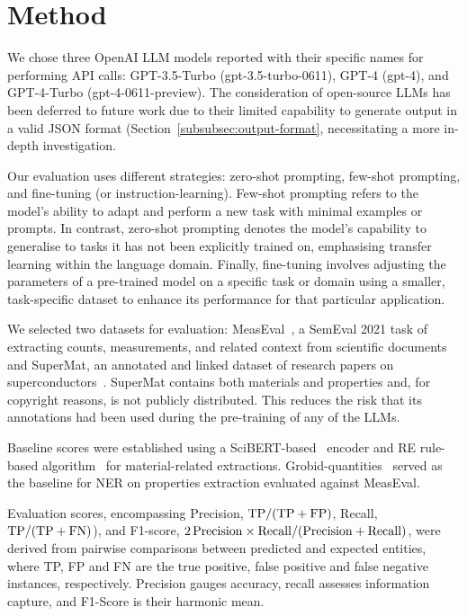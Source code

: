 

\section{Method}
\label{sec:method}

We chose three OpenAI LLM models reported with their specific names for performing API calls: GPT-3.5-Turbo (gpt-3.5-turbo-0611), GPT-4 (gpt-4), and GPT-4-Turbo (gpt-4-0611-preview). 
The consideration of open-source LLMs has been deferred to future work due to their limited capability to generate output in a valid JSON format (Section~\ref{subsubsec:output-format}, necessitating a more in-depth investigation.

Our evaluation uses different strategies: zero-shot prompting, few-shot prompting, and fine-tuning (or instruction-learning).  
Few-shot prompting refers to the model's ability to adapt and perform a new task with minimal examples or prompts. In contrast, zero-shot prompting denotes the model's capability to generalise to tasks it has not been explicitly trained on, emphasising transfer learning within the language domain.
Finally, fine-tuning involves adjusting the parameters of a pre-trained model on a specific task or domain using a smaller, task-specific dataset to enhance its performance for that particular application.

We selected two datasets for evaluation: MeasEval~\cite{harper2021semeval2021}, a SemEval 2021 task of extracting counts, measurements, and related context from scientific documents and SuperMat, an annotated and linked dataset of research papers on superconductors~\cite{lfoppiano2021supermat}. 
SuperMat contains both materials and properties and, for copyright reasons, is not publicly distributed. 
This reduces the risk that its annotations had been used during the pre-training of any of the LLMs.

Baseline scores were established using a SciBERT-based~\cite{beltagy2020scibert} encoder and RE rule-based algorithm~\cite{lfoppiano2023automatic} for material-related extractions. Grobid-quantities~\cite{foppiano2019quantities} served as the baseline for NER on properties extraction evaluated against MeasEval.

Evaluation scores, encompassing Precision, $\rm TP/(TP+FP)$, Recall, $\rm TP/(TP+FN)$), and F1-score, $\rm 2\, Precision \times Recall / (Precision + Recall)$, were derived from pairwise comparisons between predicted and expected entities, where TP, FP and FN are the true positive, false positive and false negative instances, respectively. Precision gauges accuracy, recall assesses information capture, and F1-Score is their harmonic mean.

